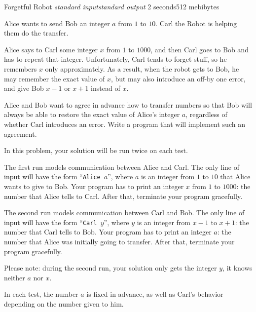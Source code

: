 \gdef\thisproblemorigin{180429p, practice session}
\gdef\thisproblemauthor{Ivan Kazmenko}
\gdef\thisproblemdeveloper{Ivan Kazmenko}
\begin{problem}{Forgetful Robot}
{\textsl{standard input}}{\textsl{standard output}}
{2 seconds}{512 mebibytes}{}

Alice wants to send Bob an integer $a$ from $1$ to $10$.
Carl the Robot is helping them do the transfer.

Alice says to Carl some integer $x$ from $1$ to $1000$,
and then Carl goes to Bob and has to repeat that integer.
Unfortunately, Carl tends to forget stuff, so he remembers $x$
only approximately.
As a result, when the robot gets to Bob, he may remember the exact value
of $x$, but may also introduce an off-by one error, and give Bob
$x - 1$ or $x + 1$ instead of $x$.

Alice and Bob want to agree in advance how to transfer numbers
so that Bob will always be able to restore the exact value of Alice's
integer $a$, regardless of whether Carl introduces an error.
Write a program that will implement such an agreement.

\Interaction

In this problem, your solution will be run twice on each test.

The first run models communication between Alice and Carl.
The only line of input will have the form
``\texttt{Alice~$a$}'', where $a$ is an integer from $1$ to $10$
that Alice wants to give to Bob.
Your program has to print an integer $x$ from $1$ to $1000$:
the number that Alice tells to Carl.
After that, terminate your program gracefully.

The second run models communication between Carl and Bob.
The only line of input will have the form
``\texttt{Carl~$y$}'', where $y$ is an integer from $x - 1$ to $x + 1$:
the number that Carl tells to Bob.
Your program has to print an integer $a$: the number that Alice
was initially going to transfer.
After that, terminate your program gracefully.

Please note: during the second run, your solution only gets the integer $y$,
it knows neither $a$ nor $x$.

In each test, the number $a$ is fixed in advance,
as well as Carl's behavior depending on the number given to him.

\Examples

\begin{example}
%
%
%
%
\end{example}


\end{problem}
